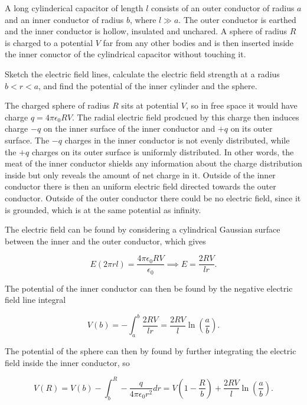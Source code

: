 \documentclass[english,a4paper,12pt]{report}
\begin{document}
{A long cylinderical capacitor of length \(l\) consists of an outer conductor of radius \(a\) and an inner conductor of radius \(b\), where \(l \gg a\). The outer conductor is earthed and the inner conductor is hollow, insulated and unchared. A sphere of radius \(R\) is charged to a potential \(V\) far from any other bodies and is then inserted inside the inner conuctor of the cylindrical capacitor without touching it. 

Sketch the electric field lines, calculate the electric field strength at a radius \(b<r<a\), and find the potential of the inner cylinder and the sphere.}
{The charged sphere of radius \(R\) sits at potential \(V\), so in free space it would have charge \(q = 4\pi \epsilon_0 RV\). The radial electric field prodcued by this charge then induces charge \(-q\) on the inner surface of the inner conductor and \(+q\) on its outer surface. The \(-q\) charges in the inner conductor is not evenly distributed, while the \(+q\) charges on its outer surface is uniformly distributed. In other words, the meat of the inner conductor shields any information about the charge distribution inside but only reveals the amount of net charge in it. Outside of the inner conductor there is then an uniform electric field directed towards the outer conductor. Outside of the outer conductor there could be no electric field, since it is grounded, which is at the same potential as infinity.

The electric field can be found by considering a cylindrical Gaussian surface between the inner and the outer conductor, which gives

\begin{equation}
    E(2\pi rl) = \frac{4\pi \epsilon_0 RV}{\epsilon_0 } \implies E = \frac{2RV}{lr}.  
\end{equation}

The potential of the inner conductor can then be found by the negative electric field line integral 

\begin{equation}
    V(b) = -\int_{a}^{b} \frac{2RV}{lr} = \frac{2RV}{l} \ln \left( \frac{a}{b}  \right).
\end{equation}

The potential of the sphere can then by found by further integrating the electric field inside the inner conductor, so 

\begin{equation}
    V(R) = V(b) - \int_{b}^{R} -\frac{q}{4\pi \epsilon_0 r^2}dr = V\left( 1-\frac{R}{b}  \right)  + \frac{2RV}{l} \ln \left( \frac{a}{b}  \right).
\end{equation}
~
} 
\end{document}
